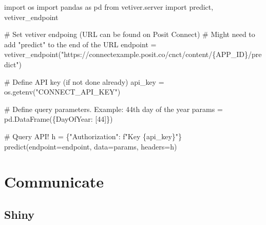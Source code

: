 \documentclass[
  letterpaper,
  DIV=11,
  numbers=noendperiod]{scrreprt}
\newenvironment{Shaded}{\begin{snugshade}}{\end{snugshade}}
\newcommand{\CommentTok}[1]{\textcolor[rgb]{0.37,0.37,0.37}{#1}}
\newcommand{\DecValTok}[1]{\textcolor[rgb]{0.68,0.00,0.00}{#1}}
\newcommand{\ImportTok}[1]{\textcolor[rgb]{0.00,0.46,0.62}{#1}}
\newcommand{\NormalTok}[1]{\textcolor[rgb]{0.00,0.23,0.31}{#1}}
\newcommand{\OperatorTok}[1]{\textcolor[rgb]{0.37,0.37,0.37}{#1}}
\newcommand{\SpecialCharTok}[1]{\textcolor[rgb]{0.37,0.37,0.37}{#1}}
\newcommand{\SpecialStringTok}[1]{\textcolor[rgb]{0.13,0.47,0.30}{#1}}
\newcommand{\StringTok}[1]{\textcolor[rgb]{0.13,0.47,0.30}{#1}}
\begin{document}
\begin{Shaded}
\begin{Highlighting}[]
\ImportTok{import}\NormalTok{ os}
\ImportTok{import}\NormalTok{ pandas }\ImportTok{as}\NormalTok{ pd}
\ImportTok{from}\NormalTok{ vetiver.server }\ImportTok{import}\NormalTok{ predict, vetiver\_endpoint}

\CommentTok{\# Set vetiver endpoing (URL can be found on Posit Connect)}
\CommentTok{\#  Might need to add "predict" to the end of the URL}
\NormalTok{endpoint }\OperatorTok{=}\NormalTok{ vetiver\_endpoint(}\StringTok{"https://connectexample.posit.co/cnct/content/}\SpecialCharTok{\{APP\_ID\}}\StringTok{/predict"}\NormalTok{)}

\CommentTok{\# Define API key (if not done already)}
\NormalTok{api\_key }\OperatorTok{=}\NormalTok{ os.getenv(}\StringTok{"CONNECT\_API\_KEY"}\NormalTok{)}

\CommentTok{\# Define query parameters. Example: 44th day of the year}
\NormalTok{params }\OperatorTok{=}\NormalTok{ pd.DataFrame(\{}\StringTok{\textquotesingle{}DayOfYear\textquotesingle{}}\NormalTok{: [}\DecValTok{44}\NormalTok{]\})}

\CommentTok{\# Query API!}
\NormalTok{h }\OperatorTok{=}\NormalTok{ \{}\StringTok{"Authorization"}\NormalTok{: }\SpecialStringTok{f"Key }\SpecialCharTok{\{}\NormalTok{api\_key}\SpecialCharTok{\}}\SpecialStringTok{"}\NormalTok{\}}
\NormalTok{predict(endpoint}\OperatorTok{=}\NormalTok{endpoint, data}\OperatorTok{=}\NormalTok{params, headers}\OperatorTok{=}\NormalTok{h)}
\end{Highlighting}
\end{Shaded}

\part{Communicate}

\chapter{Shiny}\label{shiny}
\end{document}
